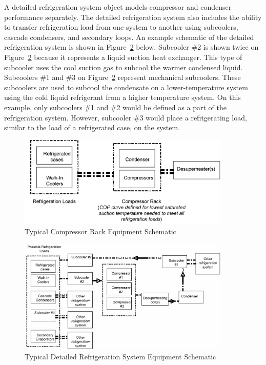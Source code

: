 A detailed refrigeration system object models compressor and condenser performance separately. The detailed refrigeration system also includes the ability to transfer refrigeration load from one system to another using subcoolers, cascade condensers, and secondary loops. An example schematic of the detailed refrigeration system is shown in Figure~\ref{fig:typical-detailed-refrigeration-system} below. Subcooler \#2 is shown twice on~ Figure~\ref{fig:typical-detailed-refrigeration-system} because it represents a liquid suction heat exchanger. This type of subcooler uses the cool suction gas to subcool the warmer condensed liquid. Subcoolers \#1 and \#3 on Figure~\ref{fig:typical-detailed-refrigeration-system} represent mechanical subcoolers. These subcoolers are used to subcool the condensate on a lower-temperature system using the cold liquid refrigerant from a higher temperature system. On this example, only subcoolers \#1 and \#2 would be defined as a part of the refrigeration system. However, subcooler \#3 would place a refrigerating load, similar to the load of a refrigerated case, on the system.

\begin{figure}[hbtp] %
\centering
\includegraphics[width=0.9\textwidth, height=0.9\textheight, keepaspectratio=true]{media/image6091.png}
\caption{Typical Compressor Rack Equipment Schematic \protect \label{fig:typical-compressor-rack-equipment-schematic}}
\end{figure}

\begin{figure}[hbtp] %
\centering
\includegraphics[width=0.9\textwidth, height=0.9\textheight, keepaspectratio=true]{media/image6092.png}
\caption{Typical Detailed Refrigeration System Equipment Schematic \protect \label{fig:typical-detailed-refrigeration-system}}
\end{figure}

